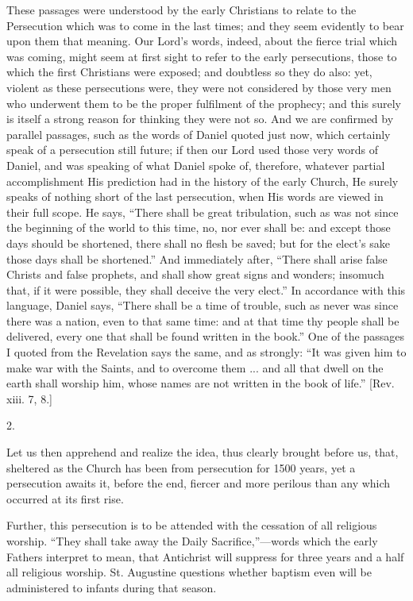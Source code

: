 These passages were understood by the early Christians to relate to
the Persecution which was to come in the last times; and they seem
evidently to bear upon them that meaning. Our Lord's words, indeed,
about the fierce trial which was coming, might seem at first sight to
refer to the early persecutions, those to which the first Christians
were exposed; and doubtless so they do also: yet, violent as these
persecutions were, they were not considered by those very men who
underwent them to be the proper fulfilment of the prophecy; and this
surely is itself a strong reason for thinking they were not so. And we
are confirmed by parallel passages, such as the words of Daniel quoted
just now, which certainly speak of a persecution still future; if then
our Lord used those very words of Daniel, and was speaking of what
Daniel spoke of, therefore, whatever partial accomplishment His
prediction had in the history of the early Church, He surely speaks of
nothing short of the last persecution, when His words are viewed in
their full scope. He says, ``There shall be great tribulation,
such as was not since the beginning of the world to this time,
no, nor ever shall be: and except those days should be shortened,
there shall no flesh be saved; but for the elect's sake those days
shall be shortened.'' And immediately after, ``There shall
arise false Christs and false prophets, and shall show great signs and
wonders; insomuch that, if it were possible, they shall deceive the
very elect.'' In accordance with this language, Daniel says,
``There shall be a time of trouble, such as never was since there
was a nation, even to that same time: and at that time thy people
shall be delivered, every one that shall be found written in the
book.'' One of the passages I quoted from the Revelation says the
same, and as strongly: ``It was given him to make war with the
Saints, and to overcome them ... and all that dwell on the earth shall
worship him, whose names are not written in the book of life.''
[Rev. xiii. 7, 8.]

2.

Let us then apprehend and realize the idea, thus clearly brought
before us, that, sheltered as the Church has been from persecution for
1500 years, yet a persecution awaits it, before the end, fiercer and
more perilous than any which occurred at its first rise.

Further, this persecution is to be attended with the cessation of
all religious worship. ``They shall take away the Daily
Sacrifice,''—words which the early Fathers interpret to mean,
that Antichrist will suppress for three years and a half all religious
worship. St. Augustine questions whether baptism even will be
administered to infants during that season.

